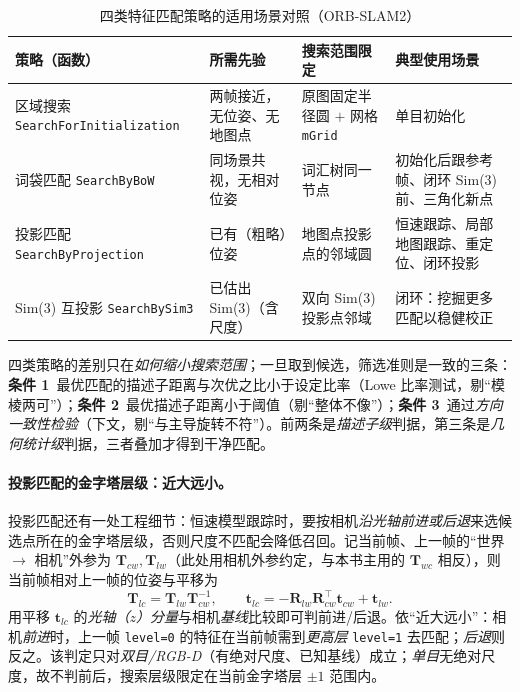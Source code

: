 \begin{table}[H]\centering\small
\caption{四类特征匹配策略的适用场景对照（ORB-SLAM2）}
\label{tab:vo-match-strategies}
\begin{tabular}{p{}p{}p{}p{}}
\toprule
策略（函数） & 所需先验 & 搜索范围限定 & 典型使用场景 \\
\midrule
区域搜索 \texttt{SearchForInitialization} & 两帧接近，无位姿、无地图点 & 原图固定半径圆 $+$ 网格 \texttt{mGrid} & 单目初始化 \\
词袋匹配 \texttt{SearchByBoW} & 同场景共视，无相对位姿 & 词汇树同一节点 & 初始化后跟参考帧、闭环 Sim(3) 前、三角化新点 \\
投影匹配 \texttt{SearchByProjection} & 已有（粗略）位姿 & 地图点投影点的邻域圆 & 恒速跟踪、局部地图跟踪、重定位、闭环投影 \\
Sim(3) 互投影 \texttt{SearchBySim3} & 已估出 Sim(3)（含尺度） & 双向 Sim(3) 投影点邻域 & 闭环：挖掘更多匹配以稳健校正 \\
\bottomrule
\end{tabular}
\end{table}

\begin{note}
四类策略的差别只在\emph{如何缩小搜索范围}；一旦取到候选，筛选准则是一致的三条：\textbf{条件 1}~最优匹配的描述子距离与次优之比小于设定比率（Lowe 比率测试，剔“模棱两可”）；\textbf{条件 2}~最优描述子距离小于阈值（剔“整体不像”）；\textbf{条件 3}~通过\emph{方向一致性检验}（下文，剔“与主导旋转不符”）。前两条是\emph{描述子级}判据，第三条是\emph{几何统计级}判据，三者叠加才得到干净匹配。
\end{note}

\paragraph{投影匹配的金字塔层级：近大远小。}
投影匹配还有一处工程细节\cite{murartal2017orbslam2}：恒速模型跟踪时，要按相机\emph{沿光轴前进或后退}来选候选点所在的金字塔层级，否则尺度不匹配会降低召回。记当前帧、上一帧的“世界 $\to$ 相机”外参为 $\mathbf{T}_{cw},\mathbf{T}_{lw}$（此处用相机外参约定，与本书主用的 $\mathbf{T}_{wc}$ 相反），则当前帧相对上一帧的位姿与平移为
\begin{equation}\label{eq:vo-match-tlc}
  \mathbf{T}_{lc}=\mathbf{T}_{lw}\mathbf{T}_{cw}^{-1},\qquad
  \mathbf{t}_{lc}=-\mathbf{R}_{lw}\mathbf{R}_{cw}^{\top}\mathbf{t}_{cw}+\mathbf{t}_{lw}.
\end{equation}
用平移 $\mathbf{t}_{lc}$ 的\emph{光轴（$z$）分量}与相机\emph{基线}比较即可判前进/后退。依“近大远小”：相机\emph{前进}时，上一帧 \texttt{level=0} 的特征在当前帧需到\emph{更高层} \texttt{level=1} 去匹配；\emph{后退}则反之。该判定只对\emph{双目/RGB-D}（有绝对尺度、已知基线）成立；\emph{单目}无绝对尺度，故不判前后，搜索层级限定在当前金字塔层 $\pm 1$ 范围内。

